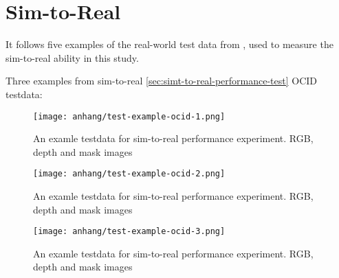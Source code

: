 \chapter{Sim-to-Real}
\label{appendix:testdata-examples-simtoreal}

	It follows five examples of the real-world test data from \cite{Suchi2019}, used to measure the sim-to-real ability in this study.
	
	Three examples from sim-to-real \ref{sec:simt-to-real-performance-test} OCID testdata:
	\begin{figure}[H]
		\centering
		\texttt{[image: anhang/test-example-ocid-1.png]}
		\caption[An examle testdata for sim-to-real performance experiment. RGB, depth and mask images]{An examle testdata for sim-to-real performance experiment. RGB, depth and mask images}
	\end{figure}
	\begin{figure}[H]
		\centering
		\texttt{[image: anhang/test-example-ocid-2.png]}
		\caption[An examle testdata for sim-to-real performance experiment. RGB, depth and mask images]{An examle testdata for sim-to-real performance experiment. RGB, depth and mask images}
	\end{figure}
	\begin{figure}[H]
		\centering
		\texttt{[image: anhang/test-example-ocid-3.png]}
		\caption[An examle testdata for sim-to-real performance experiment. RGB, depth and mask images]{An examle testdata for sim-to-real performance experiment. RGB, depth and mask images}
	\end{figure}
	
